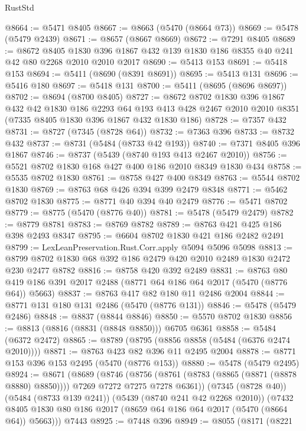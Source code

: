 \begin{lexlean}{RustStd}
\begin{coremodule}
{\begin{coremodule}
{{{{{{{{{{{{{{{{{{{{{{{{{{{{{{{@8664 := @5471 @8405
@8667 := @8663 (@5470 (@8664 @73))
@8669 := @5478 (@5479 @2439)
@8671 := @8657 (@8667 @8669)
@8672 := @7291 @8405
@8689 := @8672
    @8405
    @1830
    @396
    @1867
    @432
    @139
    @1830
    @186
    @8355
    @40
    @241
    @42
    @80
    @2268
    @2010
    @2010
    @2017
@8690 := @5413 @153
@8691 := @5418 @153
@8694 := @5411 (@8690 (@8391 @8691))
@8695 := @5413 @131
@8696 := @5416 @180
@8697 := @5418 @131
@8700 := @5411 (@8695 (@8696 @8697))
@8702 := @8694 (@8700 @8405)
@8727 := @8672
    @8702
    @1830
    @396
    @1867
    @432
    @42
    @1830
    @186
    @2293
    @64
    @193
    @413
    @428
    @2467
    @2010
    @2010
    @8351
    (@7335 @8405 @1830 @396 @1867 @432 @1830 @186)
@8728 := @7357 @432
@8731 := @8727 (@7345 (@8728 @64))
@8732 := @7363 @396
@8733 := @8732 @432
@8737 := @8731 (@5484 (@8733 @42 @193))
@8740 := @7371 @8405 @396 @1867
@8746 := @8737 (@5439 (@8740 @193 @413 @2467 @2010))
@8756 := @5521 @8702 @1830 @168 @427 @400 @186 @2010 @8349 @1830 @434
@8758 := @5535 @8702 @1830
@8761 := @8758 @427 @400 @8349
@8763 := @5544 @8702 @1830
@8769 := @8763 @68 @426 @394 @399 @2479 @8348
@8771 := @5462 @8702 @1830
@8775 := @8771 @40 @394 @40 @2479
@8776 := @5471 @8702
@8779 := @8775 (@5470 (@8776 @40))
@8781 := @5478 (@5479 @2479)
@8782 := @8779 @8781
@8783 := @8769 @8782
@8789 := @8763 @421 @425 @186 @398 @2493 @8347
@8795 := @6604 @8702 @1830 @421 @186 @2482 @2491
@8799 := LexLeanPreservation.Rust.Corr.apply @5094 @5096 @5098
@8813 := @8799 @8702 @1830 @68 @392 @186 @2479 @420 @2010 @2489 @1830 @2472 @230 @2477 @8782
@8816 := @8758 @420 @392 @2489
@8831 := @8763 @80 @419 @186 @391 @2017 @2488 (@8771 @64 @186 @64 @2017 (@5470 (@8776 @64)) @5663)
@8837 := @8763 @417 @82 @180 @11 @2486 @2004
@8844 := @8771 @131 @180 @131 @2486 (@5470 (@8776 @131))
@8846 := @5478 (@5479 @2486)
@8848 := @8837 (@8844 @8846)
@8850 := @5570 @8702 @1830
@8856 := @8813 (@8816 (@8831 (@8848 @8850))) @6705 @6361
@8858 := @5484 (@6372 @2472)
@8865 := @8789 (@8795 (@8856 @8858 (@5484 (@6376 @2474 @2010))))
@8871 := @8763 @423 @82 @396 @11 @2495 @2004
@8878 := @8771 @153 @396 @153 @2495 (@5470 (@8776 @153))
@8880 := @5478 (@5479 @2495)
@8924 := @8671
    (@8689
      (@8746
        (@8756 (@8761 (@8783 (@8865 (@8871 (@8878 @8880) @8850)))) @7269 @7272 @7275 @7278 @6361))
      (@7345 (@8728 @40))
      (@5484 (@8733 @139 @241))
      (@5439 (@8740 @241 @42 @2268 @2010))
      (@7432 @8405 @1830 @80 @186 @2017 (@8659 @64 @186 @64 @2017 (@5470 (@8664 @64)) @5663)))
    @7443
@8925 := @7448 @396
@8949 := @8055
    (@8171
      (@8221
}}}}}}}}}}}}}}}}}}}}}}}}}}}}}}}
\end{coremodule}}
\end{coremodule}
\end{lexlean}
